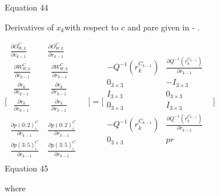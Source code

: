 Equation 44

Derivatives of $x_{k}$with respect to $c$ and $p$are given in - 
. 

$\lbrack \begin{matrix}
\frac{\partial O_{W,k}^{C}}{\partial c_{k-1}} & \frac{\partial 
O_{W,k}^{C}}{\partial r_{k-1}} & \\
\begin{matrix}
\frac{\partial W_{W,k}^{C}}{\partial c_{k-1}} & \\
\frac{\partial c_{k}}{\partial c_{k-1}} & \\
\frac{\partial r_{k}}{\partial c_{k-1}} & \\
\end{matrix}
 & \begin{matrix}
\frac{\partial W_{W,k}^{C}}{\partial r_{k-1}} & \\
\frac{\partial c_{k}}{\partial r_{k-1}} & \\
\frac{\partial r_{k}}{\partial r_{k-1}} & \\
\end{matrix}
 & \\
\frac{\partial p(0:2)_{i}^{C}}{\partial c_{k-1}} & \frac{\partial 
p(0:2)_{i}^{C}}{\partial r_{k-1}} & \\
\frac{\partial p(3:5)_{i}^{C}}{\partial c_{k-1}} & \frac{\partial 
p(3:5)_{i}^{C}}{\partial r_{k-1}} & \\
\end{matrix}
\rbrack =\lbrack \begin{matrix}
-Q^{-1}(r_{k}^{C_{k-1}}) & \frac{\partial 
Q^{-1}(r_{k}^{C_{k-1}})}{\partial r_{k-1}} & \\
0_{3\times 3} & -I_{3\times 3} & \\
I_{3\times 3} & 0_{3\times 3} & \\
0_{3\times 3} & I_{3\times 3} & \\
-Q^{-1}(r_{k}^{C_{k-1}}) & \frac{\partial 
Q^{-1}(r_{k}^{C_{k-1}})}{\partial r_{k-1}} & \\
0_{3\times 3} & pr & \\
\end{matrix}
\rbrack $\\


Equation 45

where

